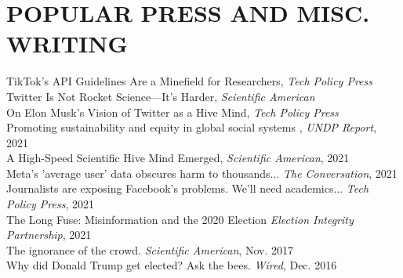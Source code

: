 \documentclass[paper=a4,fontsize=11pt]{scrartcl}
\newcommand{\NewPart}[1]{\section*{\uppercase{#1}}}
\newcommand{\EducationEntry}[4]{
		\noindent \textbf{#1} \hfill 					%
		\colorbox{White}{%
			\parbox{10em}{%
			\hfill\color{Black}#2}} \par				%
		\noindent \textit{#3} \par					%
		\noindent\hangindent=2em\hangafter=0 \small #4 	%
		\normalsize \par}
\newcommand{\talkEntry}[2]{						%
		\noindent #1 \hfill 					%
		\colorbox{White}{\color{Black}#2} \par		%
		}
\begin{document}
\NewPart{Popular Press and Misc. Writing}{}
TikTok’s API Guidelines Are a Minefield for Researchers, \textit{Tech Policy Press}\\
Twitter Is Not Rocket Science—It’s Harder, \textit{Scientific American}\\
On Elon Musk’s Vision of Twitter as a Hive Mind, \textit{Tech Policy Press}\\
Promoting sustainability and equity in global social systems , \textit{UNDP Report}, 2021\\
A High-Speed Scientific Hive Mind Emerged, \textit{Scientific American}, 2021\\%
Meta's 'average user' data obscures harm to thousands... \textit{The Conversation}, 2021\\%
Journalists are exposing Facebook’s problems. We’ll need academics... \textit{Tech Policy Press}, 2021\\%
The Long Fuse: Misinformation and the 2020 Election \textit{Election Integrity Partnership}, 2021\\
The ignorance of the crowd. \textit{Scientific American}, Nov. 2017\\%
Why did Donald Trump get elected? Ask the bees. \textit{Wired}, Dec. 2016\\%
\end{document}
